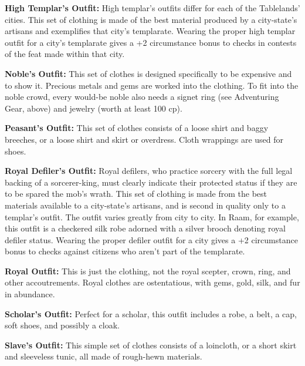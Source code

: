 \textbf{High Templar’s Outfit:} High templar’s outfits differ for each of the Tablelands’ cities. This set of clothing is made of the best material produced by a city-state’s artisans and exemplifies that city’s templarate. Wearing the proper high templar outfit for a city’s templarate gives a +2 circumstance bonus to  checks in contests of the  feat made within that city.


\textbf{Noble's Outfit:} This set of clothes is designed specifically to be expensive and to show it. Precious metals and gems are worked into the clothing. To fit into the noble crowd, every would-be noble also needs a signet ring (see Adventuring Gear, above) and jewelry (worth at least 100 cp).

\textbf{Peasant's Outfit:} This set of clothes consists of a loose shirt and baggy breeches, or a loose shirt and skirt or overdress. Cloth wrappings are used for shoes.

\textbf{Royal Defiler’s Outfit:} Royal defilers, who practice sorcery with the full legal backing of a sorcerer-king, must clearly indicate their protected status if they are to be spared the mob’s wrath. This set of clothing is made from the best materials available to a city-state’s artisans, and is second in quality only to a templar’s outfit. The outfit varies greatly from city to city. In Raam, for example, this outfit is a checkered silk robe adorned with a silver brooch denoting royal defiler status. Wearing the proper defiler outfit for a city gives a +2 circumstance bonus to  checks against citizens who aren’t part of the templarate.

\textbf{Royal Outfit:} This is just the clothing, not the royal scepter, crown, ring, and other accoutrements. Royal clothes are ostentatious, with gems, gold, silk, and fur in abundance.

\textbf{Scholar's Outfit:} Perfect for a scholar, this outfit includes a robe, a belt, a cap, soft shoes, and possibly a cloak.

\textbf{Slave’s Outfit:} This simple set of clothes consists of a loincloth, or a short skirt and sleeveless tunic, all made of rough-hewn materials.

